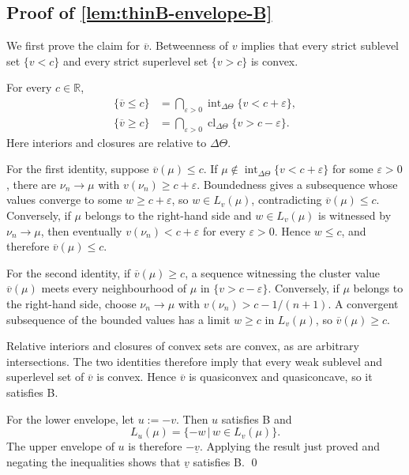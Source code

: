 \documentclass[11pt]{article}
\newcommand{\sep}{\,|\,}
\begin{document}
\subsection*{Proof of \cref{lem:thinB-envelope-B}}
We first prove the claim for $\overline v$. Betweenness of $v$ implies that every strict sublevel set $\{v<c\}$ and every strict superlevel set $\{v>c\}$ is convex.

For every $c\in\mathbb{R}$,
\begin{align}
    \{\overline v\leq c\}
    &=
    \bigcap_{\varepsilon>0}
    \operatorname{int}_{\Delta\Theta}\{v<c+\varepsilon\},
    \label{eq:upper-envelope-sublevel}\\
    \{\overline v\geq c\}
    &=
    \bigcap_{\varepsilon>0}
    \operatorname{cl}_{\Delta\Theta}\{v>c-\varepsilon\}.
    \label{eq:upper-envelope-superlevel}
\end{align}
Here interiors and closures are relative to $\Delta\Theta$.

For the first identity, suppose $\overline v(\mu)\leq c$. If $\mu\notin\operatorname{int}_{\Delta\Theta}\{v<c+\varepsilon\}$ for some $\varepsilon>0$, there are $\nu_n\to\mu$ with $v(\nu_n)\geq c+\varepsilon$. Boundedness gives a subsequence whose values converge to some $w\geq c+\varepsilon$, so $w\in L_v(\mu)$, contradicting $\overline v(\mu)\leq c$. Conversely, if $\mu$ belongs to the right-hand side and $w\in L_v(\mu)$ is witnessed by $\nu_n\to\mu$, then eventually $v(\nu_n)<c+\varepsilon$ for every $\varepsilon>0$. Hence $w\leq c$, and therefore $\overline v(\mu)\leq c$.

For the second identity, if $\overline v(\mu)\geq c$, a sequence witnessing the cluster value $\overline v(\mu)$ meets every neighbourhood of $\mu$ in $\{v>c-\varepsilon\}$. Conversely, if $\mu$ belongs to the right-hand side, choose $\nu_n\to\mu$ with $v(\nu_n)>c-1/(n+1)$. A convergent subsequence of the bounded values has a limit $w\geq c$ in $L_v(\mu)$, so $\overline v(\mu)\geq c$.

Relative interiors and closures of convex sets are convex, as are arbitrary intersections. The two identities therefore imply that every weak sublevel and superlevel set of $\overline v$ is convex. Hence $\overline v$ is quasiconvex and quasiconcave, so it satisfies B.

For the lower envelope, let $u:=-v$. Then $u$ satisfies B and
\[
    L_u(\mu)=\{-w\sep w\in L_v(\mu)\}.
\]
The upper envelope of $u$ is therefore $-\underline v$. Applying the result just proved and negating the inequalities shows that $\underline v$ satisfies B. \qed
\end{document}
